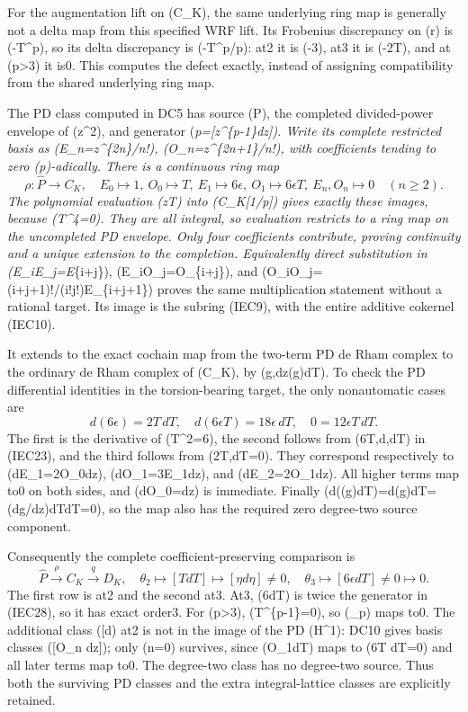 \documentclass[
]{article}
\begin{document}
For the augmentation lift on (C\_K), the same underlying ring map is
generally not a delta map from this specified WRF lift. Its Frobenius
discrepancy on (r) is (-T\^{}p), so its delta discrepancy is
(-T\^{}p/p): at2 it is (-3\epsilon), at3 it is (-2\epsilon T), and at
(p\textgreater3) it is0. This computes the defect exactly, instead of
assigning compatibility from the shared underlying ring map.

The PD class computed in DC5 has source (\widehat P), the completed
divided-power envelope of (z\^{}2), and generator
(\theta\emph{p={[}z\^{}\{p-1\}dz{]}). Write its complete restricted
basis as (E\_n=z\^{}\{2n\}/n!), (O\_n=z\^{}\{2n+1\}/n!), with
coefficients tending to zero (p)-adically. There is a continuous ring
map \[
\rho:\widehat P\longrightarrow C_K,\quad
E_0\mapsto1,\ O_0\mapsto T,\ E_1\mapsto6\epsilon,
\ O_1\mapsto6\epsilon T,\ E_n,O_n\mapsto0\quad(n\ge2).
\tag{IEC38}
\] The polynomial evaluation (z\mapsto T) into (C\_K{[}1/p{]}) gives
exactly these images, because (T\^{}4=0). They are all integral, so
evaluation restricts to a ring map on the uncompleted PD envelope. Only
four coefficients contribute, proving continuity and a unique extension
to the completion. Equivalently direct substitution in
(E\_iE\_j=E}\{i+j\}), (E\_iO\_j=O\_\{i+j\}),
and (O\_iO\_j=(i+j+1)!/(i!j!)E\_\{i+j+1\}) proves the same
multiplication statement without a rational target. Its image is the
subring (IEC9), with the entire additive cokernel (IEC10).

It extends to the exact cochain map from the two-term PD de Rham complex
to the ordinary de Rham complex of (C\_K), by (g,dz\mapsto\rho(g)dT). To
check the PD differential identities in the torsion-bearing target, the
only nonautomatic cases are \[
d(6\epsilon)=2T\,dT,\quad
d(6\epsilon T)=18\epsilon\,dT,\quad
0=12\epsilon T\,dT.
\tag{IEC39}
\] The first is the derivative of (T\^{}2=6\epsilon), the second follows
from (6T,d\epsilon,dT) in (IEC23), and the third follows from
(2\epsilon T,dT=0). They correspond respectively to (dE\_1=2O\_0dz),
(dO\_1=3E\_1dz), and (dE\_2=2O\_1dz). All higher terms map to0 on both
sides, and (dO\_0=dz) is immediate. Finally
(d(\rho(g)dT)=d\rho(g)\wedge dT=\rho(dg/dz)dT\wedge dT=0), so the map
also has the required zero degree-two source component.

Consequently the complete coefficient-preserving comparison is \[
\widehat P\xrightarrow{\rho}C_K\xrightarrow{q}D_K,
\quad
\theta_2\longmapsto[TdT]\longmapsto[\eta d\eta]\ne0,
\quad
\theta_3\longmapsto[6\epsilon dT]\ne0\longmapsto0.
\tag{IEC40}
\] The first row is at2 and the second at3. At3, (6\epsilon dT) is twice
the generator in (IEC28), so it has exact order3. For (p\textgreater3),
(T\^{}\{p-1\}=0), so (\theta\_p) maps to0. The additional class
({[}\epsilon d\epsilon{]}) at2 is not in the image of the PD (H\^{}1):
DC10 gives basis classes ({[}O\_n dz{]}); only (n=0) survives, since
(O\_1dT) maps to (6\epsilon T dT=0) and all later terms map to0. The
degree-two class has no degree-two source. Thus both the surviving PD
classes and the extra integral-lattice classes are explicitly retained.
\end{document}
